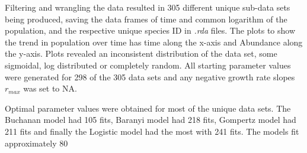 
Filtering and wrangling the data resulted in 305 different unique sub-data sets being produced, saving the data frames of time and common logarithm of the population, and the respective unique species ID in \textit{.rda} files. The plots to show the trend in population over time has time along the x-axis and Abundance along the y-axis. Plots revealed an inconsistent distribution of the data set, some sigmoidal, log distributed or completely random.  All starting parameter values were generated for 298 of the 305 data sets and any negative growth rate slopes $r_{max}$ was set to NA.

Optimal parameter values were obtained for most of the unique data sets. The Buchanan model had 105 fits, Baranyi model had 218 fits, Gompertz model had 211 fits and finally the Logistic model had the most with 241 fits. The models fit approximately 80%
